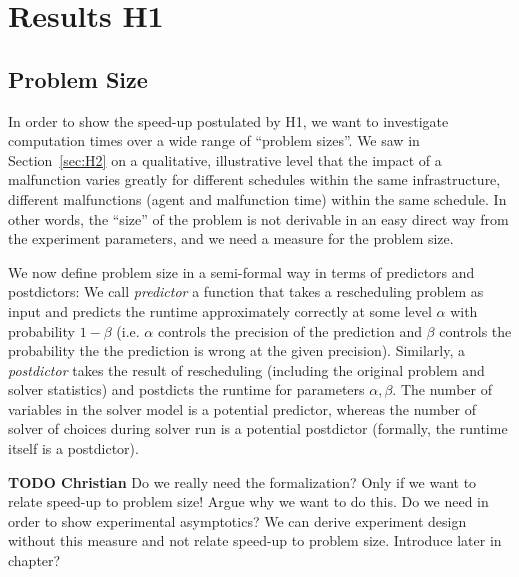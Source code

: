 \documentclass{article}
\begin{document}
\section{Results H1}\label{sec:ResultsH1}


\subsection{Problem Size}

In order to show the speed-up postulated by H1, we want to investigate computation times over a wide range of ``problem sizes''. We saw in Section~\ref{sec:H2} on a qualitative, illustrative level that the impact of a malfunction varies greatly for different schedules within the same infrastructure, different malfunctions (agent and malfunction time) within the same schedule. In other words, the ``size'' of the problem is not derivable in an easy direct way from the experiment parameters, and we need a measure for the problem size.

We now define problem size in a semi-formal way in terms of predictors and postdictors:  We call \emph{predictor} a function that takes a rescheduling problem as input and predicts the runtime approximately correctly at some level $\alpha$ with probability $1-\beta$ (i.e. $\alpha$ controls the precision of the prediction and $\beta$ controls the probability the the prediction is wrong at the given precision).
Similarly, a \emph{postdictor} takes the result of rescheduling (including the original problem and solver statistics) and postdicts the runtime for parameters $\alpha,\beta$. The number of variables in the solver model is a potential predictor, whereas the number of solver of choices during solver run is a potential postdictor (formally, the runtime itself is a postdictor).

\begin{mdframed}
{\bf TODO Christian} Do we really need the formalization? Only if we want to relate speed-up to problem size! Argue why we want to do this. Do we need in order to show experimental asymptotics? We can derive experiment design without this measure and not relate speed-up to problem size. Introduce later in chapter?
\end{mdframed}
\end{document}
